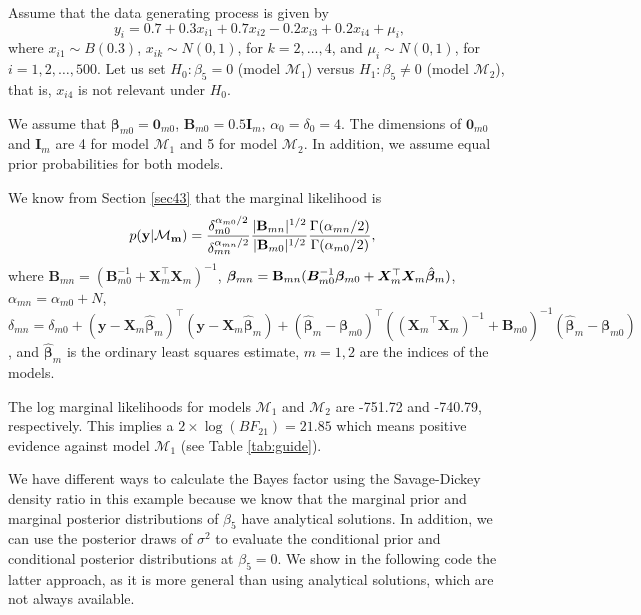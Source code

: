 Assume that the data generating process is given by  
\[
y_{i} = 0.7 + 0.3x_{i1} + 0.7x_{i2} - 0.2x_{i3} + 0.2x_{i4} + \mu_i,
\]
where \(x_{i1} \sim B(0.3)\), \(x_{ik} \sim N(0,1)\), for \(k = 2, \dots, 4\), and \(\mu_i \sim N(0, 1)\), for \(i = 1, 2, \dots, 500\). Let us set \(H_0: \beta_5 = 0\) (model \(\mathcal{M}_1\)) versus \(H_1: \beta_5 \neq 0\) (model \(\mathcal{M}_2\)), that is, $x_{i4}$ is not relevant under $H_0$.

We assume that \(\bm{\beta}_{m0} = \bm{0}_{m0}\), \(\bm{B}_{m0} = 0.5 \bm{I}_{m}\), \(\alpha_0 = \delta_0 = 4\). The dimensions of \(\bm{0}_{m0}\) and \(\bm{I}_m\) are 4 for model \(\mathcal{M}_1\) and 5 for model \(\mathcal{M}_2\). In addition, we assume equal prior probabilities for both models.

We know from Section \ref{sec43} that the marginal likelihood is
\begin{align*}
	p(\bf{y}|\mathcal{M}_m)&=\frac{\delta_{m0}^{\alpha_{m0}/2}}{\delta_{mn}^{\alpha_{mn}/2}}\frac{|{\bf{B}}_{mn}|^{1/2}}{|{\bf{B}}_{m0}|^{1/2}}\frac{\Gamma(\alpha_{mn}/2)}{\Gamma(\alpha_{m0}/2)},
\end{align*}
where  ${{\bm{B}}}_{mn} = ({\bm{B}}_{m0}^{-1} + {\bm{X}}_m^{\top}{\bm{X}}_m)^{-1}$, $\bm{\beta}_{mn} = {{\bf{B}}}_{mn}({\bm{B}}_{m0}^{-1}\bm{\beta}_{m0} + {\bm{X}}_m^{\top}{\bm{X}}_m\hat{\bm{\beta}}_m)$, $\alpha_{mn}=\alpha_{m0}+N$, $\delta_{mn}=\delta_{m0}+({\bm{y}}-{\bm{X}}_m\hat{\bm{\beta}}_m)^{\top}({\bm{y}}-{\bm{X}}_m\hat{\bm{\beta}}_m)+(\hat{\bm{\beta}}_m-\bm{\beta}_{m0})^{\top}(({\bm{X}_m}^{\top}{\bm{X}_m})^{-1}+{\bm{B}}_{m0})^{-1}(\hat{\bm{\beta}}_m-\bm{\beta}_{m0})$, and $\hat{\bm{\beta}}_m$ is the ordinary least squares estimate, $m=1,2$ are the indices of the models.

The log marginal likelihoods for models $\mathcal{M}_1$ and $\mathcal{M}_2$ are -751.72 and -740.79, respectively. This implies a $2\times\log(BF_{21})=21.85$ which means positive evidence against model $\mathcal{M}_1$ (see Table \ref{tab:guide}).

We have different ways to calculate the Bayes factor using the Savage-Dickey density ratio in this example because we know that the marginal prior and marginal posterior distributions of $\beta_5$ have analytical solutions. In addition, we can use the posterior draws of $\sigma^2$ to evaluate the conditional prior and conditional posterior distributions at $\beta_5=0$. We show in the following code the latter approach, as it is more general than using analytical solutions, which are not always available.

